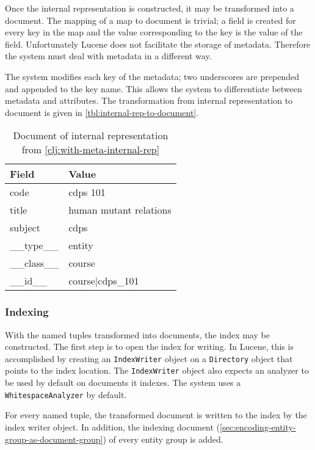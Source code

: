 			Once the internal representation is constructed, it may be transformed into a document.  The mapping of a map to document is trivial; a field is created for every key in the map and the value corresponding to the key is the value of the field.  Unfortunately Lucene does not facilitate the storage of metadata.  Therefore the system must deal with metadata in a different way.
			
			The system modifies each key of the metadata; two underscores are prepended and appended to the key name.  This allows the system to differentiate between metadata and attributes.  The transformation from internal representation to document is given in \vref{tbl:internal-rep-to-document}.
			
			\begin{table}
				\centering
				
				\begin{tabular}{ll}
					\toprule
					Field & Value \\
					\midrule
					code & cdps 101 \\
					title & human mutant relations \\
					subject & cdps \\
					\_\_type\_\_ & entity \\
					\_\_class\_\_ & course \\
					\_\_id\_\_ & course|cdps\_101 \\
					\bottomrule
				\end{tabular}
				
				\caption{Document of internal representation from \vref{clj:with-meta-internal-rep}}
				\label{tbl:internal-rep-to-document}
			\end{table}
		
		\subsubsection{Indexing}
			With the named tuples transformed into documents, the index may be constructed.  The first step is to open the index for writing.  In Lucene, this is accomplished by creating an \texttt{IndexWriter} object on a \texttt{Directory} object that points to the index location.  The \texttt{IndexWriter} object also expects an analyzer to be used by default on documents it indexes.  The system uses a \texttt{WhitespaceAnalyzer} by default.
			
			For every named tuple, the transformed document is written to the index by the index writer object.  In addition, the indexing document (\cref{sec:encoding-entity-group-as-document-group}) of every entity group is added.
		
